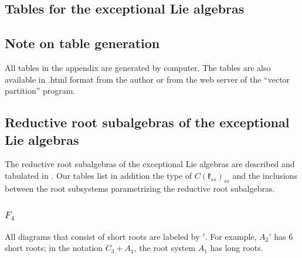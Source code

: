 \documentclass[12pt]{report}
\newcommand{\kk}{\mathfrak{k}}
\newcommand{\sP}{\mathrm{sp}}
\newcommand{\so}{\mathrm{so}}
\newcommand{\arxivVersion}[1]{#1}
\begin{document}
\nocite{Jantzen}
\nocite{VinbergOnishchik}
\nocite{Serre}
\nocite{Joseph:MinDimNilpotentOrbit}
\nocite{BorhoKraft}
\cleardoublepage
{}



\begin{appendix}

\arxivVersion{
\chapter{Tables for the exceptional Lie algebras}
\section{Note on table generation}
All tables in the appendix are generated by computer. The tables are also available in .html format from the author or from the web server of the ``vector partition'' program.



\section{Reductive root subalgebras of the exceptional Lie algebras}\label{secRootSATables}
The reductive root subalgebras of the exceptional Lie algebras are described and tabulated in \cite{Dynkin:Semisimple}. Our tables list in addition the type of $C(\kk_{ss})_{ss}$ and the inclusions between the root subsystems parametrizing the reductive root subalgebras.
\subsection{$F_4$}
All diagrams that consist of short roots are labeled by $'$. For example, $A_2'$ has 6 short roots; in the notation $C_3+A_1$, the root system $A_1$ has long roots.

}
\end{appendix}
\end{document}
